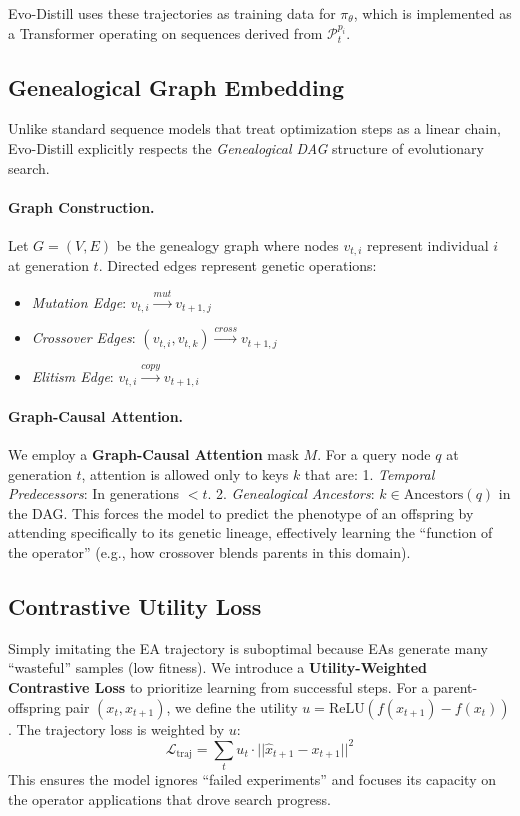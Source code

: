 \documentclass{article}
\begin{document}
Evo-Distill uses these trajectories as training data for $\pi_\theta$, which is implemented as a Transformer operating on sequences derived from $\mathcal{P}_t^{p_i}$.

\subsection{Genealogical Graph Embedding}

Unlike standard sequence models that treat optimization steps as a linear chain, Evo-Distill explicitly respects the \emph{Genealogical DAG} structure of evolutionary search.

\paragraph{Graph Construction.}
Let $G = (V, E)$ be the genealogy graph where nodes $v_{t,i}$ represent individual $i$ at generation $t$. Directed edges represent genetic operations:
\begin{itemize}
    \item \emph{Mutation Edge}: $v_{t,i} \xrightarrow{mut} v_{t+1, j}$
    \item \emph{Crossover Edges}: $(v_{t,i}, v_{t,k}) \xrightarrow{cross} v_{t+1, j}$
    \item \emph{Elitism Edge}: $v_{t,i} \xrightarrow{copy} v_{t+1, i}$
\end{itemize}

\paragraph{Graph-Causal Attention.}
We employ a \textbf{Graph-Causal Attention} mask $M$. For a query node $q$ at generation $t$, attention is allowed only to keys $k$ that are:
1.  \emph{Temporal Predecessors}: In generations $< t$.
2.  \emph{Genealogical Ancestors}: $k \in \text{Ancestors}(q)$ in the DAG.
This forces the model to predict the phenotype of an offspring by attending specifically to its genetic lineage, effectively learning the ``function of the operator'' (e.g., how crossover blends parents in this domain).

\subsection{Contrastive Utility Loss}

Simply imitating the EA trajectory is suboptimal because EAs generate many ``wasteful'' samples (low fitness). We introduce a \textbf{Utility-Weighted Contrastive Loss} to prioritize learning from successful steps.
For a parent-offspring pair $(x_t, x_{t+1})$, we define the utility $u = \text{ReLU}(f(x_{t+1}) - f(x_t))$.
The trajectory loss is weighted by $u$:
\begin{equation}
    \mathcal{L}_{\text{traj}} = \sum_{t} u_t \cdot || \hat{x}_{t+1} - x_{t+1} ||^2
\end{equation}
This ensures the model ignores ``failed experiments'' and focuses its capacity on the operator applications that drove search progress.
\end{document}
